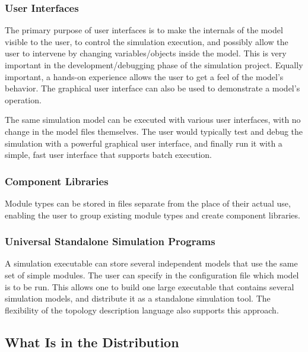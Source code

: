 \subsubsection{User Interfaces}
\label{sec:overview:user-interfaces}

The primary purpose of user interfaces is to make the internals
of the model visible to the user, to control the simulation execution,
and possibly allow the user to intervene by changing variables/objects
inside the model. This is very important in the development/debugging
phase of the simulation project. Equally important, a hands-on
experience allows the user to get a feel of the model's
behavior. The graphical user interface can also be used to
demonstrate a model's operation.


The same simulation model can be executed with various user
interfaces, with no change in the model files themselves.
The user would typically test and debug the simulation with a powerful
graphical user interface, and finally run it with a simple,
fast user interface that supports batch execution.


\subsubsection{Component Libraries}
\label{sec:overview:component-libraries}

Module types can be stored in files separate from the place
of their actual use, enabling the user to group existing
module types and create component libraries.


\subsubsection{Universal Standalone Simulation Programs}
\label{sec:overview:universal-standalone-simulation-programs}


A simulation executable can store several independent models
that use the same set of simple modules. The user can specify
in the configuration file which model is to be run. This
allows one to build one large executable that contains several
simulation models, and distribute it as a standalone simulation
tool. The flexibility of the topology description language also
supports this approach.


\subsection{What Is in the Distribution}
\label{sec:overview:what-is-in-distribution}


